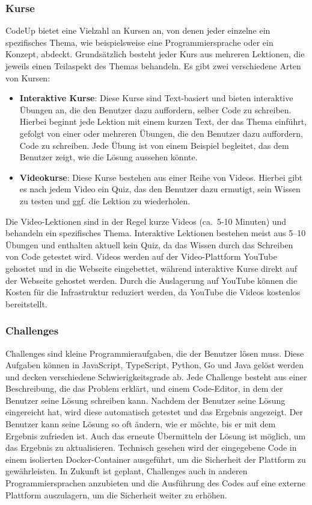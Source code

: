 \documentclass[main.tex]{subfiles}
\begin{document}
    \subsubsection{Kurse}
    CodeUp bietet eine Vielzahl an Kursen an, von denen jeder einzelne ein spezifisches Thema, wie beispielsweise eine Programmiersprache oder ein Konzept, abdeckt.
    Grundsätzlich besteht jeder Kurs aus mehreren Lektionen, die jeweils einen Teilaspekt des Themas behandeln.
    Es gibt zwei verschiedene Arten von Kursen:
    \begin{itemize}
        \item \textbf{Interaktive Kurse}: Diese Kurse sind Text-basiert und bieten interaktive Übungen an, die den Benutzer dazu auffordern, selber Code zu schreiben.
        Hierbei beginnt jede Lektion mit einem kurzen Text, der das Thema einführt, gefolgt von einer oder mehreren Übungen, die den Benutzer dazu auffordern, Code zu schreiben.
        Jede Übung ist von einem Beispiel begleitet, das dem Benutzer zeigt, wie die Lösung aussehen könnte.
        \item \textbf{Videokurse}: Diese Kurse bestehen aus einer Reihe von Videos.
        Hierbei gibt es nach jedem Video ein Quiz, das den Benutzer dazu ermutigt, sein Wissen zu testen und ggf. die Lektion zu wiederholen.
    \end{itemize}
    Die Video-Lektionen sind in der Regel kurze Videos (ca.~5-10 Minuten) und behandeln ein spezifisches Thema.
    Interaktive Lektionen bestehen meist aus 5--10 Übungen und enthalten aktuell kein Quiz, da das Wissen durch das Schreiben von Code getestet wird.
    Videos werden auf der Video-Plattform YouTube gehostet und in die Webseite eingebettet, während interaktive Kurse direkt auf der Webseite gehostet werden.
    Durch die Auslagerung auf YouTube können die Kosten für die Infrastruktur reduziert werden, da YouTube die Videos kostenlos bereitstellt.
    \subsubsection{Challenges}
    Challenges sind kleine Programmieraufgaben, die der Benutzer lösen muss.
    Diese Aufgaben können in JavaScript, TypeScript, Python, Go und Java gelöst werden und decken verschiedene Schwierigkeitsgrade ab.
    Jede Challenge besteht aus einer Beschreibung, die das Problem erklärt, und einem Code-Editor, in dem der Benutzer seine Lösung schreiben kann.
    Nachdem der Benutzer seine Lösung eingereicht hat, wird diese automatisch getestet und das Ergebnis angezeigt.
    Der Benutzer kann seine Lösung so oft ändern, wie er möchte, bis er mit dem Ergebnis zufrieden ist.
    Auch das erneute Übermitteln der Lösung ist möglich, um das Ergebnis zu aktualisieren.
    Technisch gesehen wird der eingegebene Code in einem isolierten Docker-Container ausgeführt, um die Sicherheit der Plattform zu gewährleisten.
    In Zukunft ist geplant, Challenges auch in anderen Programmiersprachen anzubieten und die Ausführung des Codes auf eine externe Plattform auszulagern, um die Sicherheit weiter zu erhöhen.
\end{document}
